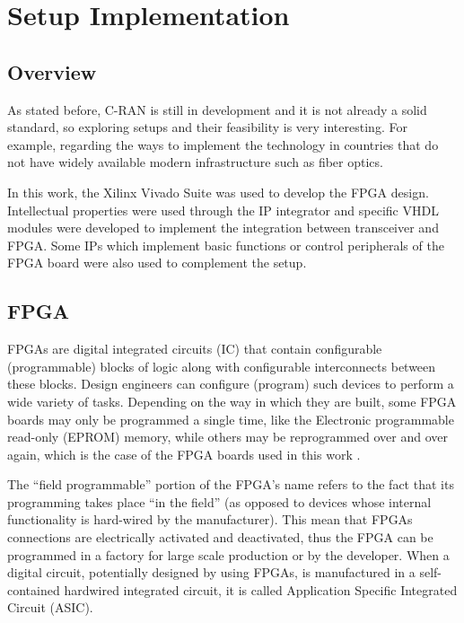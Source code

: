 \chapter{Setup Implementation}
\label{chap:implementation}

\section{Overview}

As stated before, C-RAN is still in development and it is not already a solid
standard, so exploring setups and their feasibility is very interesting. For
example, regarding the ways to implement the technology in countries that do
not have widely available modern infrastructure such as fiber optics.

In this work, the Xilinx Vivado Suite was used to develop the FPGA design.
Intellectual properties were used through the IP integrator and specific VHDL
modules were developed to implement the integration between transceiver and
FPGA. Some IPs which implement
basic functions or control peripherals of the FPGA board were also used to
complement the setup.

\section{FPGA}

FPGAs are digital integrated circuits (IC) that contain configurable
(programmable) blocks of logic along with configurable interconnects between
these blocks. Design engineers can configure (program) such devices to perform a
wide variety of tasks. Depending on the way in which they are built, some FPGA
boards may only be programmed a single time, like the Electronic programmable
read-only (EPROM) memory, while others may be reprogrammed over and over again,
which is the case of the FPGA boards used in this work \cite{max2004}.

The “field programmable” portion of the FPGA’s name refers to the fact that its
programming takes place “in the field” (as opposed to devices whose internal
functionality is hard-wired by the manufacturer). This mean that FPGAs
connections are electrically activated and deactivated, thus the FPGA can be
programmed in a factory for large scale production or by the developer. When a
digital circuit, potentially designed by using FPGAs, is manufactured in a
self-contained hardwired integrated circuit, it is called Application Specific
Integrated Circuit (ASIC).

